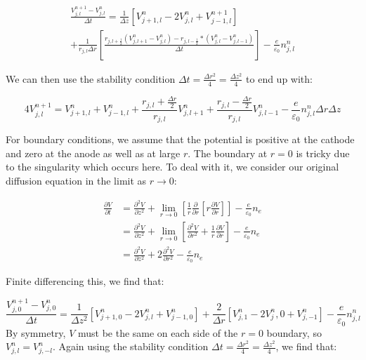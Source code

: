 \documentclass[11pt]{article}
\begin{document}
\begin{multline}
    \frac{V^{n+1}_{j,l}-V^{n}_{j,l}}{\Delta t} = \frac{1}{\Delta z}\left[ V^n_{j+1,l} - 2V^{n}_{j,l}+V^{n+1}_{j-1,l} \right] 
    \\ + \frac{1}{r_{j,l} \Delta r} \left[ \frac{r_{j,l+\frac{1}{2}} (V^n_{j,l+1} - V^n_{j,l}) - r_{j,l-\frac{1}{2}}*(V^n_{j,l} - V^n_{j,l-1})}{\Delta t} \right] - \frac{e}{\varepsilon_0}n^n_{j,l}
\end{multline}

We can then use the stability condition $\Delta t = \frac{\Delta r^2}{4} = \frac{\Delta z^2}{4}$ to end up with:

\begin{equation}
    4V^{n+1}_{j,l} = V^n_{j+1,l} + V^{n}_{j-1,l} + \frac{r_{j,l}+\frac{\Delta r}{2}}{r_{j,l}}V^n_{j,l+1} + \frac{r_{j,l} - \frac{\Delta r}{2}}{r_{j,l}} V^n_{j,l-1} - \frac{e}{\varepsilon_0}n^n_{j,l} \Delta r \Delta z
\end{equation}

For boundary conditions, we assume that the potential is positive at the cathode and zero at the anode as well as at large $r$. The boundary at $r=0$ is tricky due to the singularity which occurs here. To deal with it, we consider our original diffusion equation in the limit as $r \to 0$:

\begin{align}
    \frac{\partial{V}}{\partial{t}} &= \frac{\partial^2{V}}{\partial{z^2}} + \lim_{r\to0}\left[{\frac{1}{r}\frac{\partial}{\partial{r}} \left[ r \frac{\partial{V}}{\partial{r}}\right]}\right] - \frac{e}{\varepsilon_0}n_e \\
    &= \frac{\partial^2{V}}{\partial{z^2}} + \lim_{r\to0}\left[\frac{\partial^2{V}} {\partial{r^2}} + \frac{1}{r}\frac{\partial{V}}{\partial{r}}\right] - \frac{e}{\varepsilon_0}n_e \\
     &= \frac{\partial^2{V}}{\partial{z^2}} + 2\frac{\partial^2V}{\partial{r^2}} - \frac{e}{\varepsilon_0}n_e
\end{align}

Finite differencing this, we find that:

\begin{equation}
    \frac{V^{n+1}_{j,0}-V^{n}_{j,0}}{\Delta t} = \frac{1}{\Delta z^2}\left[ V^n_{j+1,0} - 2V^n_{j,l} + V^{n}_{j-1,0}\right] + \frac{2}{\Delta r} \left[ V^n_{j,1} - 2V^n_j,0 + V^n_{j,-1}\right] - \frac{e}{\varepsilon_0}n^n_{j,l}
\end{equation}
By symmetry, $V$ must be the same on each side of the $r=0$ boundary, so $V^n_{j,l} = V^n_{j,-l}$. Again using the stability condition $\Delta t = \frac{\Delta r^2}{4} = \frac{\Delta z^2}{4}$, we find that:
\end{document}
